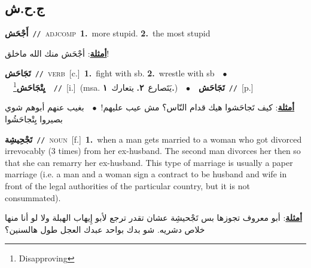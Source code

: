 \documentclass[10pt,a4paper,twoside]{article} %
\begin{document}
\begin{multicols}{2}
{{{{{{{{\vspace{-3mm}
\subsection*{\color{blue}\foreignlanguage{arabic}{ج.ح.ش}\color{blue}{}} 

{\setlength\topsep{0pt}\textbf{\foreignlanguage{arabic}{أَجْحَش}}\ {\color{gray}\texttt{//}\color{black}}\ \textsc{adj\textunderscore comp}\ \textbf{1.}~more stupid.  \textbf{2.}~the most stupid\  \begin{flushright}\color{gray}\foreignlanguage{arabic}{\textbf{\underline{\foreignlanguage{arabic}{أمثلة}}}: أجْحَش منك الله ماخلق!}\end{flushright}\color{black}} \vspace{2mm}

{\setlength\topsep{0pt}\textbf{\foreignlanguage{arabic}{تَجَاحَش}}\ {\color{gray}\texttt{//}\color{black}}\ \textsc{verb}\ [c.]\ \textbf{1.}~fight with sb.  \textbf{2.}~wrestle with sb\ \ $\bullet$\ \ \setlength\topsep{0pt}\textbf{\foreignlanguage{arabic}{يِتْجَاحَش}}\footnote{Disapproving}\ \ {\color{gray}\texttt{//}\color{black}}\ [i.]\ \color{gray}(msa. \foreignlanguage{arabic}{يَتَصارع}~\foreignlanguage{arabic}{\textbf{٢.}}  \foreignlanguage{arabic}{يتعارك}~\foreignlanguage{arabic}{\textbf{١.}})\color{black}\ \ $\bullet$\ \ \setlength\topsep{0pt}\textbf{\foreignlanguage{arabic}{تَجَاحَش}}\ {\color{gray}\texttt{//}\color{black}}\ [p.]\  \begin{flushright}\color{gray}\foreignlanguage{arabic}{\textbf{\underline{\foreignlanguage{arabic}{أمثلة}}}: كيف تَجاحَشوا هيك قدام النّاس؟ مش عيب عليهم!\ $\bullet$\ \  بغيب عنهم أبوهم شوي بصيروا يِتْجاحَشُوا}\end{flushright}\color{black}} \vspace{2mm}

{\setlength\topsep{0pt}\textbf{\foreignlanguage{arabic}{تَجْحِيشِة}}\ {\color{gray}\texttt{//}\color{black}}\ \textsc{noun}\ [f.]\ \textbf{1.}~when a man gets married to a woman who got divorced irrevocably (3 times) from her ex-husband. The second man divorces her then so that she can remarry her ex-husband. This type of marriage is usually a paper marriage (i.e. a man and a woman sign a contract to be husband and wife in front of the legal authorities of the particular country, but it is not consummated).\  \begin{flushright}\color{gray}\foreignlanguage{arabic}{\textbf{\underline{\foreignlanguage{arabic}{أمثلة}}}: أبو معروف تجوزها بس تَجْحيشِة عشان تقدر ترجع لأبو إِيهاب الهبلة ولا لو أنا منها خلاص دشريه. شو بدك بواحد عبدك العجل طول هالسنين؟}\end{flushright}\color{black}} \vspace{2mm}

}}}}}}}}
\end{multicols}
\end{document}

